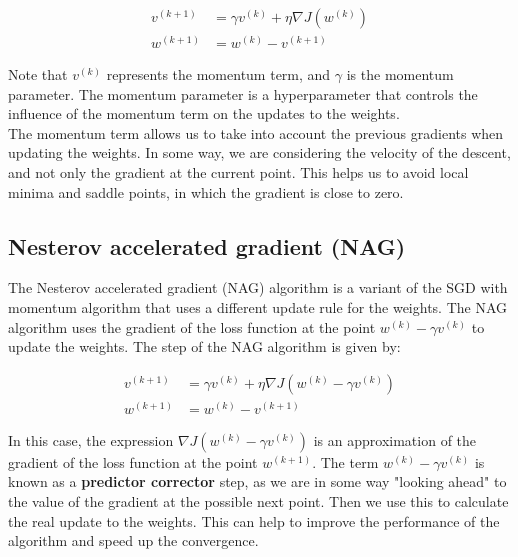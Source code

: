 \begin{equation}
    \begin{aligned}
        v^{(k+1)} &= \gamma v^{(k)} + \eta \nabla J(w^{(k)}) \\
        w^{(k+1)} &= w^{(k)} - v^{(k+1)}
    \end{aligned}
\end{equation}

Note that $v^{(k)}$ represents the momentum term, and $\gamma$ is the momentum parameter. The
momentum parameter is a hyperparameter that controls the influence of the momentum term on the
updates to the weights.\\

The momentum term allows us to take into account the previous gradients when updating the weights.
In some way, we are considering the velocity of the descent, and not only the gradient at the
current point. This helps us to avoid local minima and saddle points, in which the gradient is
close to zero.

\subsection{Nesterov accelerated gradient (NAG)}

The Nesterov accelerated gradient (NAG) algorithm is a variant of the SGD with momentum algorithm
that uses a different update rule for the weights. The NAG algorithm uses the gradient of the
loss function at the point $w^{(k)} - \gamma v^{(k)}$ to update the weights. The step
of the NAG algorithm is given by:

\begin{equation}
    \begin{aligned}
        v^{(k+1)} &= \gamma v^{(k)} + \eta \nabla J(w^{(k)} - \gamma v^{(k)}) \\
        w^{(k+1)} &= w^{(k)} - v^{(k+1)}
    \end{aligned}
\end{equation}

In this case, the expression $\nabla J(w^{(k)} - \gamma v^{(k)})$ is an approximation of the
gradient of the loss function at the point $w^{(k+1)}$. The term $w^{(k)} - \gamma v^{(k)}$ is
known as a \textbf{predictor corrector} step, as we are in some way "looking ahead" to the value
of the gradient at the possible next point. Then we use this to calculate the real update to the
weights. This can help to improve the performance of the algorithm and speed up the convergence.

